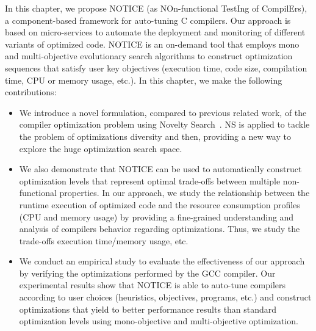 In this chapter, we propose NOTICE (as NOn-functional TestIng of CompilErs), a component-based framework for auto-tuning C compilers. Our approach is based on micro-services to automate the deployment and monitoring of different variants of optimized code. NOTICE is an on-demand tool that employs mono and multi-objective evolutionary search algorithms to construct optimization sequences that satisfy user key objectives (execution time, code size, compilation time, CPU or memory usage, etc.).
In this chapter, we make the following contributions:
\begin{itemize} 
	
	\item We introduce a novel formulation, compared to previous related work, of the compiler optimization problem using Novelty Search~\cite{lehman2008exploiting}. NS is applied to tackle the problem of optimizations diversity and then, providing a new way to explore the huge optimization search space. 
	
		
	\item We also demonstrate that NOTICE can be used to automatically construct optimization levels that represent optimal trade-offs between multiple non-functional properties. In our approach, we study the relationship between the runtime execution of optimized code and the resource consumption profiles (CPU and memory usage) by providing a fine-grained understanding and analysis of compilers behavior regarding optimizations. Thus, we study the trade-offs execution time/memory usage, etc.
	

	\item We conduct an empirical study to evaluate the effectiveness of our approach by verifying the optimizations performed by the GCC compiler.
	Our experimental results show that NOTICE is able to auto-tune compilers according to user choices (heuristics, objectives, programs, etc.) and construct optimizations that yield to better performance results than standard optimization levels using mono-objective and multi-objective optimization. 
\end{itemize}


